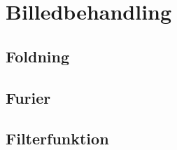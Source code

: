 \section{Billedbehandling}	%
\subsection{Foldning}		%
\subsection{Furier}			%
\subsection{Filterfunktion}	%